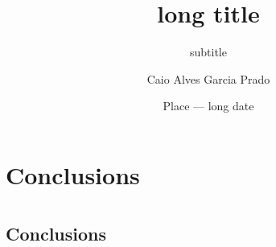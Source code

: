 \documentclass[aspectratio=43,hyperref={hidelinks}]{beamer}
\title[short title]{long title}
\subtitle{subtitle}
\author[Caio Prado]{Caio Alves Garcia Prado}
\institute{Institute or Conference Name}
\date[xx/xx/xx]{Place --- long date}
\begin{document}
\logoframe
\titleframe
{}

\begin{frame}[fragile]
    
\end{frame}

\section{Conclusions}
\section*{ }\subsection*{Conclusions}

\begin{frame}[fragile]
\end{frame}
\end{document}
